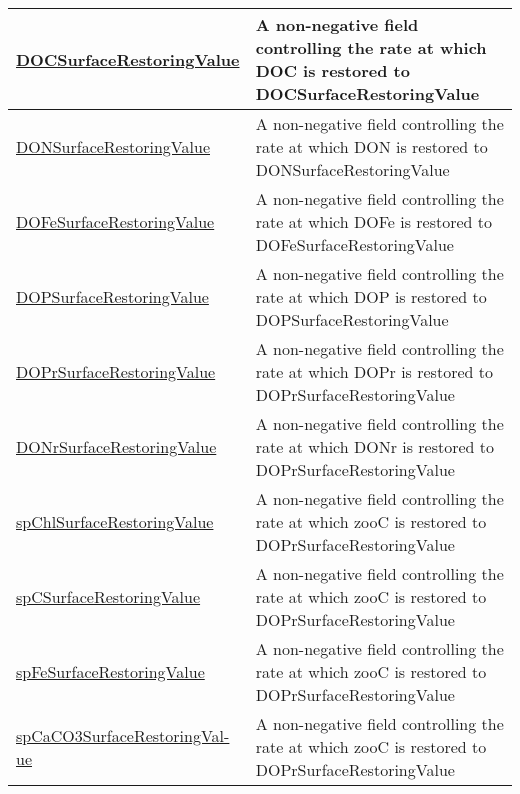 {\begin{center}
\begin{longtable}{| p{2.0in} | p{4.0in} |}
    \hline
    \hyperref[subsec:var_sec_tracersSurfaceRestoringFields_DOCSurfaceRestoringValue]{DOCSurfaceRestoringValue} & A non-negative field controlling the rate at which DOC is restored to DOCSurfaceRestoringValue \\
    \hline
    \hyperref[subsec:var_sec_tracersSurfaceRestoringFields_DONSurfaceRestoringValue]{DONSurfaceRestoringValue} & A non-negative field controlling the rate at which DON is restored to DONSurfaceRestoringValue \\
    \hline
    \hyperref[subsec:var_sec_tracersSurfaceRestoringFields_DOFeSurfaceRestoringValue]{DOFeSurfaceRestoringValue} & A non-negative field controlling the rate at which DOFe is restored to DOFeSurfaceRestoringValue \\
    \hline
    \hyperref[subsec:var_sec_tracersSurfaceRestoringFields_DOPSurfaceRestoringValue]{DOPSurfaceRestoringValue} & A non-negative field controlling the rate at which DOP is restored to DOPSurfaceRestoringValue \\
    \hline
    \hyperref[subsec:var_sec_tracersSurfaceRestoringFields_DOPrSurfaceRestoringValue]{DOPrSurfaceRestoringValue} & A non-negative field controlling the rate at which DOPr is restored to DOPrSurfaceRestoringValue \\
    \hline
    \hyperref[subsec:var_sec_tracersSurfaceRestoringFields_DONrSurfaceRestoringValue]{DONrSurfaceRestoringValue} & A non-negative field controlling the rate at which DONr is restored to DOPrSurfaceRestoringValue \\
    \hline
    \hyperref[subsec:var_sec_tracersSurfaceRestoringFields_spChlSurfaceRestoringValue]{spChlSurfaceRestoringValue} & A non-negative field controlling the rate at which zooC is restored to DOPrSurfaceRestoringValue \\
    \hline
    \hyperref[subsec:var_sec_tracersSurfaceRestoringFields_spCSurfaceRestoringValue]{spCSurfaceRestoringValue} & A non-negative field controlling the rate at which zooC is restored to DOPrSurfaceRestoringValue \\
    \hline
    \hyperref[subsec:var_sec_tracersSurfaceRestoringFields_spFeSurfaceRestoringValue]{spFeSurfaceRestoringValue} & A non-negative field controlling the rate at which zooC is restored to DOPrSurfaceRestoringValue \\
    \hline
    \hyperref[subsec:var_sec_tracersSurfaceRestoringFields_spCaCO3SurfaceRestoringValue]{spCaCO3SurfaceRestoringVal-}\hyperref[subsec:var_sec_tracersSurfaceRestoringFields_spCaCO3SurfaceRestoringValue]{ue}  & A non-negative field controlling the rate at which zooC is restored to DOPrSurfaceRestoringValue \\

\end{longtable}
\end{center}}
